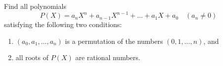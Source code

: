 \begin{problem}
    Find all polynomials
    \[
        P\left(X\right) = a_n X^n + a_{n-1} X^{n-1} + \dots + a_1 X + a_0 \quad \left(a_n \neq 0\right)
    \]
    satisfying the following two conditions:

    \begin{enumerate}
        \item \( \left(a_0, a_1, \dots, a_n\right) \) is a permutation of the numbers \( \left(0, 1, \dots, n\right) \), and
        \item all roots of \( P\left(X\right) \) are rational numbers.
    \end{enumerate}
\end{problem}
